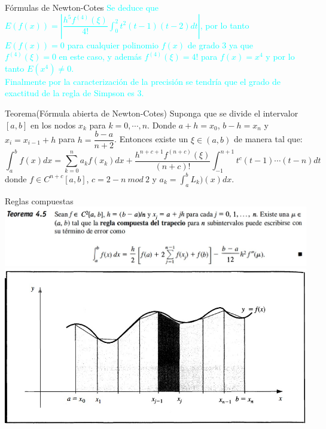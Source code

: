 \begin{frame}{Fórmulas de Newton-Cotes}
\small
\textcolor{cyan}{Se deduce que $E(f(x))=|\dfrac{h^{5}f^{(4)}(\xi)}{4!}\int_{0}^{2}t^2(t-1)(t-2)dt|$, por lo tanto $E(f(x))=0$ para cualquier polinomio $f(x)$ de grado 3 ya que $f^{(4)}(\xi)=0$ en este caso, y además $f^{(4)}(\xi)=4!$ para $f(x)=x^4$ y por lo tanto $E(x^4)\neq 0$.}\\
\textcolor{cyan}{Finalmente por la caracterización de la precisión se tendría que el grado de exactitud de la regla de Simpson es 3.}\pause
\begin{block}{Teorema(Fórmula abierta de Newton-Cotes)}
Suponga que se divide el intervalor $[a,b]$ en los nodos $x_k$ para $k=0,\cdots, n$. Donde $a+h=x_0$, $b-h=x_n$ y $x_i=x_{i-1}+h$ para $h=\dfrac{b-a}{n+2}$. Entonces existe un $\xi\in(a,b)$ de manera tal que:
$$\int_a^b f(x)dx=\sum_{k=0}^{n}a_kf(x_k)dx+\dfrac{h^{n+c+1}f^{(n+c)}(\xi)}{(n+c)!}\int_{-1}^{n+1}t^c(t-1)\cdots(t-n)dt$$
donde $f\in C^{n+c}[a,b]$, $c=2-n\ mod\ 2$ y $\displaystyle a_k=\int_{a}^{b}L_k)(x)dx$.
\end{block}
\end{frame}
\begin{frame}{Reglas compuestas}
\centering
\includegraphics[scale=0.5]{Imagen10}
\includegraphics[scale=0.5]{Imagen12}
\end{frame}
